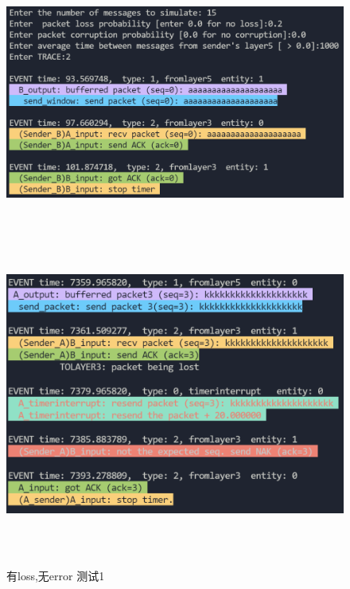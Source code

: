 \documentclass[UTF8,14pt]{article}
\numberwithin{figure}{section}
\begin{document}
\newpage
\begin{figure}[!htbp]
      \centering
      \setlength{\abovecaptionskip}{0.cm}
      \includegraphics[width=15cm,height=8.48cm]{figures/gbn1_1.png}
      \includegraphics[width=15cm,height=10.62cm]{figures/gbn1_2.png}
      \caption{有loss,无error 测试1}
\end{figure}
\end{document}
